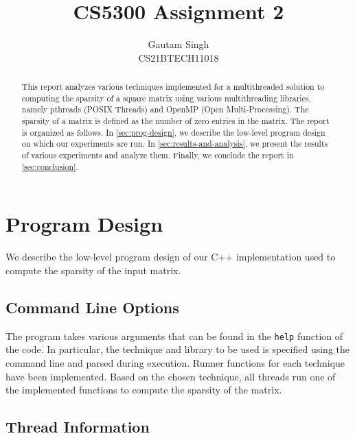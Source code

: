 \documentclass[conference,compsoc]{IEEEtran}
\begin{document}
\vspace{3cm}
\title{CS5300 Assignment 2}
\author{Gautam Singh\\CS21BTECH11018}
\maketitle
\tableofcontents

\bigskip

\begin{abstract}
    This report analyzes various techniques implemented for a multithreaded
    solution to computing the sparsity of a square matrix using various
    multithreading libraries, namely pthreads (POSIX Threads) and OpenMP (Open
    Multi-Processing). The sparsity of a matrix is defined as the number of zero
    entries in the matrix. The report is organized as follows. In
    \autoref{sec:prog-design}, we describe the low-level program design on which
    our experiments are run. In \autoref{sec:results-and-analysis}, we present
    the results of various experiments and analyze them. Finally, we conclude
    the report in \autoref{sec:conclusion}.  
\end{abstract}

\section{Program Design}
\label{sec:prog-design}

We describe the low-level program design of our C++ implementation used to
compute the sparsity of the input matrix.

\subsection{Command Line Options}
\label{subsec:cmd-line-options}

The program takes various arguments that can be found in the \texttt{help}
function of the code. In particular, the technique and library to be used is
specified using the command line and parsed during execution. Runner functions
for each technique have been implemented. Based on the chosen technique, all
threads run one of the implemented functions to compute the sparsity of the
matrix.

\subsection{Thread Information}
\label{subsec:thread-infos}
\end{document}
